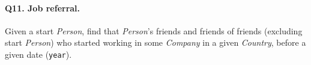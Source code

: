 \paragraph{\textbf{Q11}. Job referral.}
Given a start \emph{Person}, find that \emph{Person}'s friends and
friends of friends (excluding start \emph{Person}) who started working
in some \emph{Company} in a given \emph{Country}, before a given date
(\texttt{year}).
